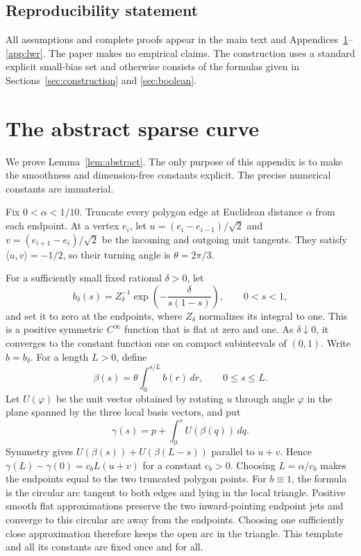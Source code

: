 \documentclass{article}
\theoremstyle{definition}
\theoremstyle{remark}
\newcommand{\1}{\mathbf 1}
\begin{document}
\subsection*{Reproducibility statement}

All assumptions and complete proofs appear in the main text and Appendices~\ref{app:abstract}--\ref{app:lwr}. The paper makes no empirical claims. The construction uses a standard explicit small-bias set and otherwise consists of the formulas given in Sections~\ref{sec:construction} and \ref{sec:boolean}.




\appendix

\section{The abstract sparse curve}
\label{app:abstract}

We prove Lemma~\ref{lem:abstract}. The only purpose of this appendix is to make the smoothness and dimension-free constants explicit. The precise numerical constants are immaterial.

Fix $0<\alpha<1/10$. Truncate every polygon edge at Euclidean distance $\alpha$ from each endpoint. At a vertex $e_i$, let $u=(e_i-e_{i-1})/\sqrt2$ and $v=(e_{i+1}-e_i)/\sqrt2$ be the incoming and outgoing unit tangents. They satisfy $\langle u,v\rangle=-1/2$, so their turning angle is $\theta=2\pi/3$.

For a sufficiently small fixed rational $\delta>0$, let \[ b_\delta(s)=Z_\delta^{-1}\exp\left(-\frac{\delta}{s(1-s)}\right),\qquad 0<s<1, \] and set it to zero at the endpoints, where $Z_\delta$ normalizes its integral to one. This is a positive symmetric $C^\infty$ function that is flat at zero and one. As $\delta\downarrow0$, it converges to the constant function one on compact subintervals of $(0,1)$. Write $b=b_\delta$. For a length $L>0$, define \[ \beta(s)=\theta\int_0^{s/L}b(r)\,dr, \qquad 0\leq s\leq L. \] Let $U(\varphi)$ be the unit vector obtained by rotating $u$ through angle $\varphi$ in the plane spanned by the three local basis vectors, and put \[ \gamma(s)=p+\int_0^sU(\beta(q))\,dq. \] Symmetry gives $U(\beta(s))+U(\beta(L-s))$ parallel to $u+v$. Hence $\gamma(L)-\gamma(0)=c_bL(u+v)$ for a constant $c_b>0$. Choosing $L=\alpha/c_b$ makes the endpoints equal to the two truncated polygon points. For $b\equiv1$, the formula is the circular arc tangent to both edges and lying in the local triangle. Positive smooth flat approximations preserve the two inward-pointing endpoint jets and converge to this circular arc away from the endpoints. Choosing one sufficiently close approximation therefore keeps the open arc in the triangle. This template and all its constants are fixed once and for all.
\end{document}
